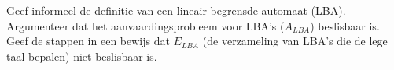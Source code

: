 \begin{question}
	Geef informeel de definitie van een lineair begrensde automaat (LBA). Argumenteer dat het aanvaardingsprobleem voor LBA's ($A_{LBA}$) beslisbaar is. Geef de stappen in een bewijs dat $E_{LBA}$ (de verzameling van LBA's die de lege taal bepalen) niet beslisbaar is.
\end{question}

\lipsum[8]